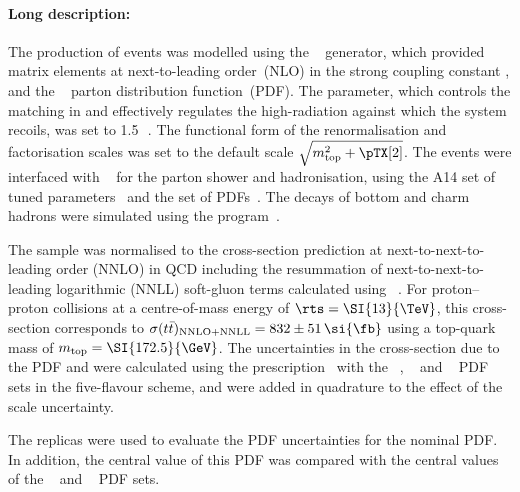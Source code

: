


\paragraph{Long description:}

The production of \ttbar events was modelled using the
\POWHEGBOX[v2]~\cite{Frixione:2007nw,Nason:2004rx,Frixione:2007vw,Alioli:2010xd}
generator, which provided matrix elements at next-to-leading
order~(NLO) in the strong coupling constant \alphas, and the
\NNPDF[3.0nlo]~\cite{Ball:2014uwa} parton distribution function~(PDF). 
The \hdamp parameter, which controls the matching in \POWHEG and
effectively regulates the high-\pT radiation against which the
\ttbar system recoils, was set to 1.5\,\mtop~\cite{ATL-PHYS-PUB-2016-020}.
The functional form of the renormalisation and factorisation scales was
set to the default scale $\sqrt{\mtop^{2} + \pTX[2]}$.
The events were interfaced with
\PYTHIA[8.230]~\cite{Sjostrand:2014zea} for the parton shower and
hadronisation, using the A14 set of tuned
parameters~\cite{ATL-PHYS-PUB-2014-021} and the \NNPDF[2.3lo]
set of PDFs~\cite{Ball:2012cx}.
The decays of bottom and charm hadrons were simulated using the
\EVTGEN[1.6.0] program~\cite{Lange:2001uf}.

The \ttbar sample was normalised to the cross-section prediction at next-to-next-to-leading order (NNLO)
in QCD including the resummation of next-to-next-to-leading logarithmic (NNLL) soft-gluon terms calculated using
\TOPpp[2.0]~\cite{Beneke:2011mq,Cacciari:2011hy,Baernreuther:2012ws,Czakon:2012zr,Czakon:2012pz,Czakon:2013goa,Czakon:2011xx}.
For proton--proton collisions at a centre-of-mass energy of $\rts = \SI{13}{\TeV}$, this cross-section corresponds to
$\sigma(\ttbar)_{\text{NNLO+NNLL}} = 832 \pm 51\,\si{\fb}$ using a top-quark mass of $\mtop = \SI{172.5}{\GeV}$.
The uncertainties in the cross-section due to the PDF and \alphas were calculated using the \PDFforLHC[15] prescription~\cite{Butterworth:2015oua}
with the \MSTW[nnlo]~\cite{Martin:2009iq,Martin:2009bu}, \CT[10nnlo]~\cite{Lai:2010vv,Gao:2013xoa} 
and \NNPDF[2.3lo]~\cite{Ball:2012cx} PDF sets in the five-flavour scheme, and were added in quadrature to the effect of the scale uncertainty.



The \NNPDF[3.0lo] replicas were used to evaluate the PDF uncertainties for the nominal PDF.
In addition, the central value of this PDF was compared with the central values of the 
\CT[14nnlo]~\cite{Dulat:2015mca} and \MMHT[nnlo]~\cite{Harland-Lang:2014zoa} PDF sets.


